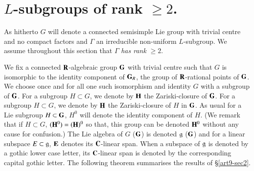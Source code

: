 \section{$L$-subgroups of rank $\geqslant 2$.}\label{art9-subsec4}
As hitherto $G$ will denote a connected semisimple Lie group with trivial centre and no compact factors and $\Gamma$ an irreducible non-uniform $L$-subgroup. We assume throughout this section that $\Gamma$ \textit{has rank } $\geqslant 2$.

\begin{notation}\label{art9-nota4.1}
We fix a connected $\mathbf{R}$-algebraic group $\mathbf{G}$ with trivial centre such that $G$ is isomorphic to the identity component of $\mathbf{G}_R$, the group of $\mathbf{R}$-rational points of $\mathbf{G}$. We choose once and for all one such isomorphism and identity $G$ with a subgroup of $\mathbf{G}$. For a subgroup $H \subset G$, we denote by $\mathbf{H}$ the Zariski-closure of $\mathbf{G}$. For a subgroup $H \subset G$, we denote by $\mathbf{H}$ the Zariski-closure of $H$ in $\mathbf{G}$. As usual for a Lie subgroup $H \subset \mathbf{G}$, $H^0$ will denote the identity component of $H$. (We remark that if $H \subset G$, $(\mathbf{H}^0) = (\mathbf{H})^0$ so that, this group can be denoted $\mathbf{H}^0$ without any cause for confusion.)   The Lie algebra of $G$ (\resp $\mathbf{G}$) is denoted $\mathfrak{g}$ (\resp $\mathbf{G}$) and for a linear subspace $E \subset \mathfrak{g}$, $\mathbf{E}$ denotes its $\mathbf{C}$-linear span. When a subspace of $\mathfrak{g}$ is denoted by a gothic lower case letter, its $\mathbf{C}$-linear span is denoted by the corresponding capital gothic letter. The following theorem summarises the results of \S \ref{art9-sec2}.
\end{notation}

